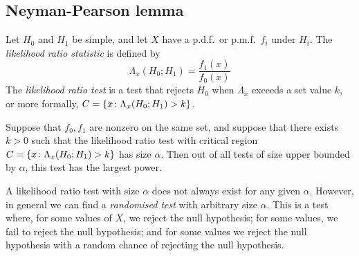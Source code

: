 \subsection{Neyman-Pearson lemma}
Let \( H_0 \) and \( H_1 \) be simple, and let \( X \) have a p.d.f.\ or p.m.f.\ \( f_i \) under \( H_i \).
The \textit{likelihood ratio statistic} is defined by
\[
	\Lambda_x(H_0; H_1) = \frac{f_1(x)}{f_0(x)}
\]
The \textit{likelihood ratio test} is a test that rejects \( H_0 \) when \( \Lambda_x \) exceeds a set value \( k \), or more formally, \( C = \qty{ x \colon \Lambda_x(H_0; H_1) > k } \).
\begin{lemma}
	Suppose that \( f_0, f_1 \) are nonzero on the same set, and suppose that there exists \( k > 0 \) such that the likelihood ratio test with critical region \( C = \qty{x \colon \Lambda_x(H_0; H_1) > k} \) has size \( \alpha \).
	Then out of all tests of size upper bounded by \( \alpha \), this test has the largest power.
\end{lemma}
\begin{remark}
	A likelihood ratio test with size \( \alpha \) does not always exist for any given \( \alpha \).
	However, in general we can find a \textit{randomised test} with arbitrary size \( \alpha \).
	This is a test where, for some values of \( X \), we reject the null hypothesis; for some values, we fail to reject the null hypothesis; and for some values we reject the null hypothesis with a random chance of rejecting the null hypothesis.
\end{remark}
